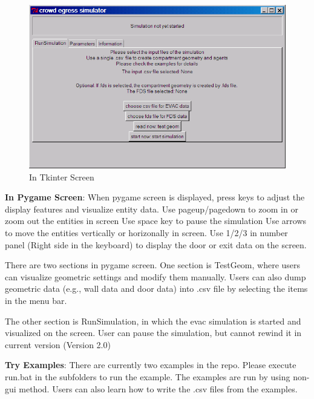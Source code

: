 \documentclass{article}
\begin{document}
\begin{figure}
\centerline{\includegraphics[bb=0bp 0bp 595bp 342bp,clip,scale=0.43]{img/gui}}
\caption{In Tkinter Screen}\label{Fig_TkScreen}
\end{figure}


\textbf{In Pygame Screen}: When pygame screen is displayed, press keys to adjust the display features and visualize entity data.
Use pageup/pagedown to zoom in or zoom out the entities in screen
Use space key to pause the simulation
Use arrows to move the entities vertically or horizonally in screen.
Use 1/2/3 in number panel (Right side in the keyboard) to display the door or exit data on the screen.

There are two sections in pygame screen.
One section is TestGeom, where users can visualize geometric settings and modify them manually.  Users can also dump geometric data (e.g., wall data and door data) into .csv file by selecting the items in the menu bar.

The other section is RunSimulation, in which the evac simulation is started and visualized on the screen.  User can pause the simulation, but cannot rewind it in current version (Version 2.0)

\textbf{Try Examples}: There are currently two examples in the repo.  Please execute run.bat in the subfolders to run the example.  The examples are run by using non-gui method.  Users can also learn how to write the .csv files from the examples.
\end{document}

